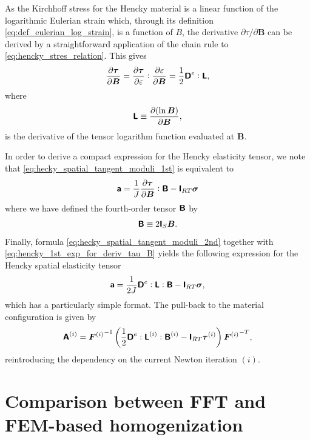 As the Kirchhoff stress for the Hencky material is a linear function of the logarithmic Eulerian strain which, through its definition \eqref{eq:def_eulerian_log_strain}, is a function of \(B\), the derivative \(\partial \tau / \partial \boldsymbol{B}\) can be derived by a straightforward application of the chain rule to \eqref{eq:hencky_stres_relation}.
This gives
\begin{equation} \label{eq:hencky_1st_exp_for_deriv_tau_B}
\frac{\partial \boldsymbol{\tau}}{\partial \boldsymbol{B}}=\frac{\partial \boldsymbol{\tau}}{\partial \varepsilon}: \frac{\partial \varepsilon}{\partial \boldsymbol{B}}=\frac{1}{2} \boldsymbol{\mathsf{D}}^e: \boldsymbol{\mathsf{L}},
\end{equation}
where
\begin{equation}
\boldsymbol{\mathsf{L}} \equiv \frac{\partial(\ln \boldsymbol{B})}{\partial \boldsymbol{B}},
\end{equation}
is the derivative of the tensor logarithm function evaluated at \(\bm B\).

In order to derive a compact expression for the Hencky elasticity tensor, we note that \eqref{eq:hecky_spatial_tangent_moduli_1st} is equivalent to
\begin{equation} \label{eq:hecky_spatial_tangent_moduli_2nd}
\boldsymbol{\mathsf{a}}=\frac{1}{J}\frac{\partial \boldsymbol{\tau}}{\partial \boldsymbol{B}}: \boldsymbol{\mathsf{B}}-\boldsymbol{\mathsf{I}}_{RT}\bm\sigma
\end{equation}
where we have defined the fourth-order tensor \(\boldsymbol{\mathsf{B}}\) by
\begin{equation}
\boldsymbol{\mathsf{B}} \equiv 2\boldsymbol{\mathsf{I}}_S \bm B.
\end{equation}
Finally, formula \eqref{eq:hecky_spatial_tangent_moduli_2nd} together with \eqref{eq:hencky_1st_exp_for_deriv_tau_B} yields the following expression for the Hencky spatial elasticity tensor
\begin{equation}
\boldsymbol{\mathsf{a}}=\frac{1}{2 J}\boldsymbol{\mathsf{D}}^e: \boldsymbol{\mathsf{L}}: \boldsymbol{\mathsf{B}}-\boldsymbol{\mathsf{I}}_{RT}\bm\sigma,
\end{equation}
which has a particularly simple format.
The pull-back to the material configuration is given by
\begin{equation} \label{eq:space_consistent_tangent}
  \boldsymbol{\mathsf{A}}^{(i)} = {\bm F^{(i)}}^{-1}\left(\frac{1}{2}\boldsymbol{\mathsf{D}}^e:{\boldsymbol{\mathsf{L}}}^{(i)}: {\boldsymbol{\mathsf{B}}}^{(i)} - \boldsymbol{\mathsf{I}}_{RT}\bm \tau^{(i)}\right){\bm F^{(i)}}^{-T},
\end{equation}
reintroducing the dependency on the current Newton iteration \((i)\).

\section{Comparison between FFT and FEM-based homogenization}


